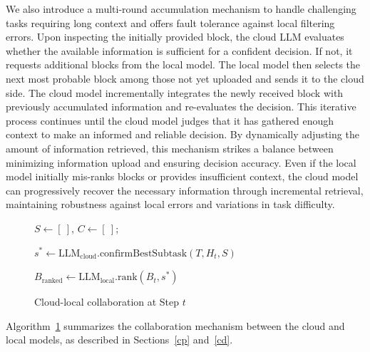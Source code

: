 We also introduce a multi-round accumulation mechanism to handle challenging tasks requiring long context and offers fault tolerance against local filtering errors. Upon inspecting the initially provided block, the cloud LLM evaluates whether the available information is sufficient for a confident decision. If not, it requests additional blocks from the local model. The local model then selects the next most probable block among those not yet uploaded and sends it to the cloud side. The cloud model incrementally integrates the newly received block with previously accumulated information and re-evaluates the decision. This iterative process continues until the cloud model judges that it has gathered enough context to make an informed and reliable decision. By dynamically adjusting the amount of information retrieved, this mechanism strikes a balance between minimizing information upload and ensuring decision accuracy. Even if the local model initially mis-ranks blocks or provides insufficient context, the cloud model can progressively recover the necessary information through incremental retrieval, maintaining robustness against local errors and variations in task difficulty. 

\begin{figure}
\vspace{-1.4em}
\begin{algorithm}[H]
\caption{Cloud-local collaboration at Step $t$}
\label{alg:core2e}


$S \gets [\ ]$, $C \gets [\ ]$;


$s^* \gets \text{LLM}_{\text{cloud}}.\text{confirmBestSubtask}(T, H_t, S)$\;

$B_{\text{ranked}} \gets \text{LLM}_{\text{local}}.\text{rank}(B_t, s^*)$\; 

\end{algorithm}
\vspace{-6em}
\end{figure}

Algorithm~\ref{alg:core2e} summarizes the collaboration mechanism between the cloud and local models, as described in Sections~\ref{cp} and~\ref{cd}.